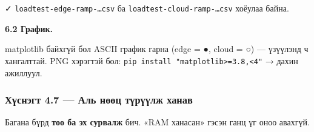 ✓ \texttt{loadtest-edge-ramp-\ldots{}csv} ба \texttt{loadtest-cloud-ramp-\ldots{}csv} хоёулаа байна.

\textbf{6.2 График.}

\begin{Shaded}
\begin{Highlighting}[]
\KeywordTok{\textbackslash{}}
\end{Highlighting}
\end{Shaded}

matplotlib байхгүй бол ASCII график гарна (edge = ●, cloud = ○) --- үзүүлэнд ч хангалттай. PNG хэрэгтэй бол: \texttt{pip\ install\ "matplotlib\textgreater{}=\allowbreak{}3.\allowbreak{}8,\textless{}4"} → дахин ажиллуул.

\hypertarget{ux445ux4afux441ux43dux44dux433ux442-4.7-ux430ux43bux44c-ux43dux4e9ux4e9ux446-ux442ux4afux440ux4afux4afux43bux436-ux445ux430ux43dux430ux432}{%
\subsubsection{Хүснэгт 4.7 --- Аль нөөц түрүүлж ханав}\label{ux445ux4afux441ux43dux44dux433ux442-4.7-ux430ux43bux44c-ux43dux4e9ux4e9ux446-ux442ux4afux440ux4afux4afux43bux436-ux445ux430ux43dux430ux432}}

Багана бүрд \textbf{тоо ба эх сурвалж} бич. «RAM ханасан» гэсэн ганц үг оноо авахгүй.

